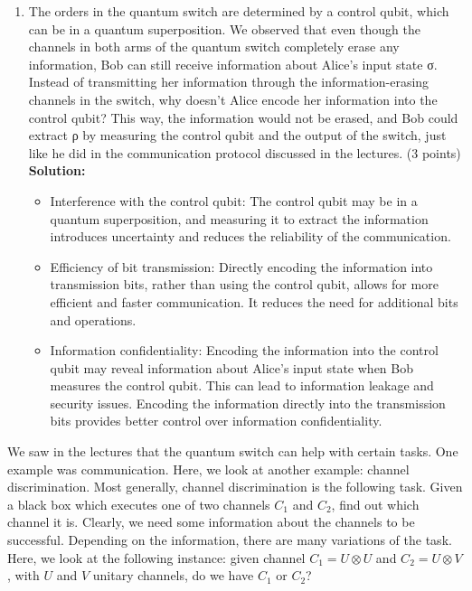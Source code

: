 \documentclass[12pt]{article}
\begin{document}
\begin{enumerate}
    \item The orders in the quantum switch are determined by a control qubit, which can be in a quantum superposition.
    We observed that even though the channels in both arms of the quantum switch completely erase any information, Bob can still receive information about Alice's input state σ. Instead of transmitting her information through the information-erasing channels in the switch, why doesn't Alice encode her information into the control qubit? This way, the information would not be erased, and Bob could extract ρ by measuring the control qubit and the output of the switch, just like he did in the communication protocol discussed in the lectures. (3 points)
    \textbf{Solution:}
    \begin{itemize}
        \item Interference with the control qubit: The control qubit may be in a quantum superposition, and measuring it to extract the information introduces uncertainty and reduces the reliability of the communication.

        \item Efficiency of bit transmission: Directly encoding the information into transmission bits, rather than using the control qubit, allows for more efficient and faster communication. It reduces the need for additional bits and operations.
        
        \item Information confidentiality: Encoding the information into the control qubit may reveal information about Alice's input state when Bob measures the control qubit. This can lead to information leakage and security issues. Encoding the information directly into the transmission bits provides better control over information confidentiality.

    \end{itemize}
\end{enumerate}


We saw in the lectures that the quantum switch can help with certain tasks. One example was communication. Here,
we look at another example: channel discrimination. Most generally, channel discrimination is the following task.
Given a black box which executes one of two channels $C_1$ and $C_2$, find out which channel it is. Clearly, we need some
information about the channels to be successful. Depending on the information, there are many variations of the task.
Here, we look at the following instance: given channel $C_1 = U \otimes U$ and $C_2 = U \otimes V$, with $U$ and $V$ unitary channels,
do we have $C_1$ or $C_2$?
\end{document}
